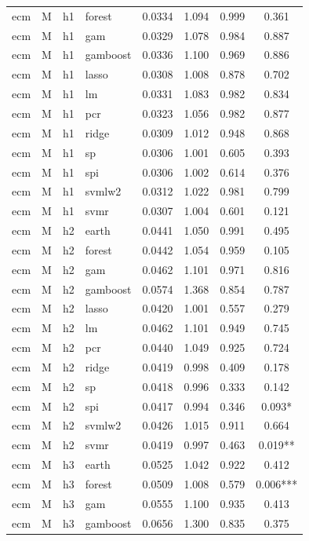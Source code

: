 \begin{ThreePartTable}
\begin{longtable}[t]{llclcccc}
ecm & M & h1 & forest & 0.0334 & 1.094 & 0.999 & 0.361\\
ecm & M & h1 & gam & 0.0329 & 1.078 & 0.984 & 0.887\\
ecm & M & h1 & gamboost & 0.0336 & 1.100 & 0.969 & 0.886\\
ecm & M & h1 & lasso & 0.0308 & 1.008 & 0.878 & 0.702\\
ecm & M & h1 & lm & 0.0331 & 1.083 & 0.982 & 0.834\\
ecm & M & h1 & pcr & 0.0323 & 1.056 & 0.982 & 0.877\\
ecm & M & h1 & ridge & 0.0309 & 1.012 & 0.948 & 0.868\\
ecm & M & h1 & sp & 0.0306 & 1.001 & 0.605 & 0.393\\
ecm & M & h1 & spi & 0.0306 & 1.002 & 0.614 & 0.376\\
ecm & M & h1 & svmlw2 & 0.0312 & 1.022 & 0.981 & 0.799\\
ecm & M & h1 & svmr & 0.0307 & 1.004 & 0.601 & 0.121\\
\addlinespace
ecm & M & h2 & earth & 0.0441 & 1.050 & 0.991 & 0.495\\
ecm & M & h2 & forest & 0.0442 & 1.054 & 0.959 & 0.105\\
ecm & M & h2 & gam & 0.0462 & 1.101 & 0.971 & 0.816\\
ecm & M & h2 & gamboost & 0.0574 & 1.368 & 0.854 & 0.787\\
ecm & M & h2 & lasso & 0.0420 & 1.001 & 0.557 & 0.279\\
ecm & M & h2 & lm & 0.0462 & 1.101 & 0.949 & 0.745\\
ecm & M & h2 & pcr & 0.0440 & 1.049 & 0.925 & 0.724\\
ecm & M & h2 & ridge & 0.0419 & 0.998 & 0.409 & 0.178\\
ecm & M & h2 & sp & 0.0418 & 0.996 & 0.333 & 0.142\\
ecm & M & h2 & spi & 0.0417 & 0.994 & 0.346 & 0.093*\\
ecm & M & h2 & svmlw2 & 0.0426 & 1.015 & 0.911 & 0.664\\
ecm & M & h2 & svmr & 0.0419 & 0.997 & 0.463 & 0.019**\\
\addlinespace
ecm & M & h3 & earth & 0.0525 & 1.042 & 0.922 & 0.412\\
ecm & M & h3 & forest & 0.0509 & 1.008 & 0.579 & 0.006***\\
ecm & M & h3 & gam & 0.0555 & 1.100 & 0.935 & 0.413\\
ecm & M & h3 & gamboost & 0.0656 & 1.300 & 0.835 & 0.375\\

\end{longtable}
\end{ThreePartTable}
